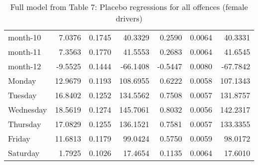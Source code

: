 \documentclass[10pt]{article}
\begin{document}
\begin{table}[ht]
\begin{tabular}{lrrrrrr}
  month-10 & 7.0376 & 0.1745 & 40.3329 & 0.2590 & 0.0064 & 40.3331 \\ 
  month-11 & 7.3563 & 0.1770 & 41.5553 & 0.2683 & 0.0064 & 41.6545 \\ 
  month-12 & -9.5525 & 0.1444 & -66.1408 & -0.5447 & 0.0080 & -67.7842 \\ 
  Monday & 12.9679 & 0.1193 & 108.6955 & 0.6222 & 0.0058 & 107.1343 \\ 
  Tuesday & 16.8402 & 0.1252 & 134.5562 & 0.7508 & 0.0057 & 131.8757 \\ 
  Wednesday & 18.5619 & 0.1274 & 145.7061 & 0.8032 & 0.0056 & 142.2317 \\ 
  Thursday & 17.0829 & 0.1255 & 136.1521 & 0.7581 & 0.0057 & 133.3355 \\ 
  Friday & 11.6813 & 0.1179 & 99.0424 & 0.5750 & 0.0059 & 98.0172 \\ 
  Saturday & 1.7925 & 0.1026 & 17.4654 & 0.1135 & 0.0064 & 17.6010 \\ 
   \hline
\end{tabular}
\caption{Full model from Table 7: Placebo regressions for all offences (female drivers)} 
\label{tab_7_all_pts_no_age_F}
\end{table}


\clearpage
\pagebreak



\end{document}
